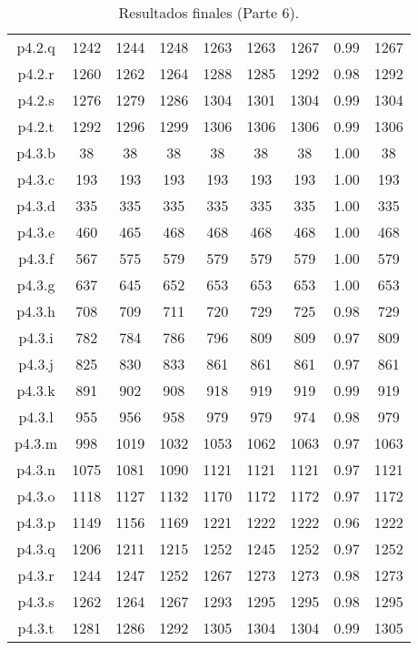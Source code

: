 \begin{table}
\begin{center}
\begin{tabular}{ |c|c|c|c|c|c|c|c|c| }
p4.2.q & 1242 & 1244 & 1248 & 1263 & 1263 & 1267 & 0.99 & 1267 \\
p4.2.r & 1260 & 1262 & 1264 & 1288 & 1285 & 1292 & 0.98 & 1292 \\
p4.2.s & 1276 & 1279 & 1286 & 1304 & 1301 & 1304 & 0.99 & 1304 \\
p4.2.t & 1292 & 1296 & 1299 & 1306 & 1306 & 1306 & 0.99 & 1306 \\
p4.3.b & 38 & 38 & 38 & 38 & 38 & 38 & 1.00 & 38 \\
p4.3.c & 193 & 193 & 193 & 193 & 193 & 193 & 1.00 & 193 \\
p4.3.d & 335 & 335 & 335 & 335 & 335 & 335 & 1.00 & 335 \\
p4.3.e & 460 & 465 & 468 & 468 & 468 & 468 & 1.00 & 468 \\
p4.3.f & 567 & 575 & 579 & 579 & 579 & 579 & 1.00 & 579 \\
p4.3.g & 637 & 645 & 652 & 653 & 653 & 653 & 1.00 & 653 \\
p4.3.h & 708 & 709 & 711 & 720 & 729 & 725 & 0.98 & 729 \\
p4.3.i & 782 & 784 & 786 & 796 & 809 & 809 & 0.97 & 809 \\
p4.3.j & 825 & 830 & 833 & 861 & 861 & 861 & 0.97 & 861 \\
p4.3.k & 891 & 902 & 908 & 918 & 919 & 919 & 0.99 & 919 \\
p4.3.l & 955 & 956 & 958 & 979 & 979 & 974 & 0.98 & 979 \\
p4.3.m & 998 & 1019 & 1032 & 1053 & 1062 & 1063 & 0.97 & 1063 \\
p4.3.n & 1075 & 1081 & 1090 & 1121 & 1121 & 1121 & 0.97 & 1121 \\
p4.3.o & 1118 & 1127 & 1132 & 1170 & 1172 & 1172 & 0.97 & 1172 \\
p4.3.p & 1149 & 1156 & 1169 & 1221 & 1222 & 1222 & 0.96 & 1222 \\
p4.3.q & 1206 & 1211 & 1215 & 1252 & 1245 & 1252 & 0.97 & 1252 \\
p4.3.r & 1244 & 1247 & 1252 & 1267 & 1273 & 1273 & 0.98 & 1273 \\
p4.3.s & 1262 & 1264 & 1267 & 1293 & 1295 & 1295 & 0.98 & 1295 \\
p4.3.t & 1281 & 1286 & 1292 & 1305 & 1304 & 1304 & 0.99 & 1305 \\
\hline
\end{tabular}
\end{center}
\caption{Resultados finales (Parte 6).}
\label{tab:resultadosFinales6}
\end{table}



